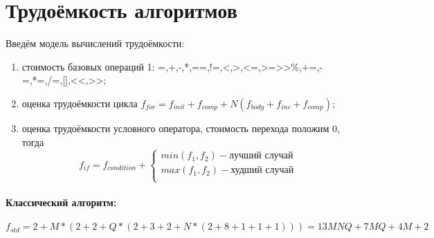 \section{Трудоёмкость алгоритмов}
\label{sec:labour}
Введём модель вычислений трудоёмкости:
\begin{enumerate}[1)]
	\item стоимость базовых операций 1: =,+,-,*,==,!=,<,>,<=,>=>>\%,+=,-=,*=,/=,[],<<,>>;
	\item оценка трудоёмкости цикла $f_{for}=f_{init}+f_{comp}+N(f_{body}+f_{inc}+f_{comp})$;
	\item оценка трудоёмкости условного оператора, стоимость перехода положим 0, тогда
	\begin{equation}
f_{if}=f_{condition}+\begin{cases}
min(f_{1},f_{2})-\text{лучший случай}\\
max(f_{1},f_{2})-\text{худший случай}\\
\end{cases}
	\end{equation} 
\end{enumerate}
\paragraph{Классический алгоритм:}
\begin{equation}
f_{std}=2+M*(2+2+Q*(2+3+2+N*(2+8+1+1+1)))=13MNQ+7MQ+4M+2
\end{equation}
